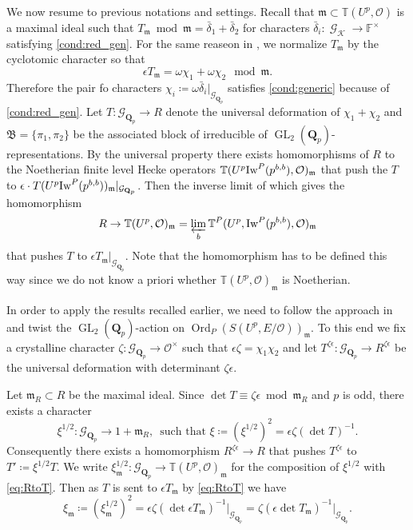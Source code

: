 \documentclass[leqno]{amsart}
\theoremstyle{definition}
\theoremstyle{remark}
\newcommand{\oo}{\mathcal{O}}
\newcommand{\fF}{\mathbb{F}} %
\newcommand{\Qp}{\mathbf{Q}_p}
\DeclareMathOperator{\GL}{GL}
\DeclareMathOperator{\Gal}{\mathcal{G}}
\newcommand{\fm}{\mathfrak{m}}
\DeclareMathOperator{\Ord}{Ord} %
\newcommand{\Gp}{\mathcal{G}_{\Qp}} %
\newcommand{\B}{\mathfrak B} %
\newcommand{\K}{{\mathcal{K}}} %
\newcommand{\Iw}{\textnormal{Iw}} %
\newcommand{\TT}{\mathbb{T}} %
\begin{document}
We now resume to previous notations and settings.
Recall that $\fm\subset \TT(U^p,\oo)$ 
is a maximal ideal such that
$T_\fm\bmod\fm =\bar{\delta}_1+\bar{\delta}_2$
for characters $\bar{\delta}_i\colon \Gal_\K\to \fF^\times$
satisfying \eqref{cond:red_gen}.
For the same reaseon in \cite[Rem 3.5.3]{pan},
we normalize $T_\fm$ by the cyclotomic character so that
\[
    \epsilon T_\fm=\omega\chi_1+\omega\chi_2\mod\fm.
\]
Therefore the pair fo characters
$\chi_i\coloneqq \omega\bar{\delta}_i\vert_{\Gp}$
satisfies \eqref{cond:generic} because of 
\eqref{cond:red_gen}.
Let $T\colon \Gp\to R$
denote the universal deformation 
of $\chi_1+\chi_2$
and $\B=\{\pi_1,\pi_2\}$
be the associated block of irreducible of $\GL_2(\Qp)$-representations.
By the universal property
there exists homomorphisms of $R$
to the Noetherian finite level
Hecke operators $\TT(U^p\Iw^P(p^{b,b}),\oo)_\fm$
that push the $T$ to 
$\epsilon\cdot T(U^p\Iw^P(p^{b,b}))_\fm\vert_{\Gp}$.
Then the inverse limit of which
gives the homomorphism
\begin{equation}\label{eq:RtoT}
    R\to \TT(U^p,\oo)_{\fm}=
    \varprojlim_b\TT^P(U^p,\Iw^P(p^{b,b}),\oo)_{\fm}
\end{equation}
that pushes $T$ to $\epsilon T_\fm\vert_{\Gp}$.
Note that the homomorphism has to be defined this way
since we do not know a priori whether
$\TT(U^p,\oo)_{\fm}$ is Noetherian.

In order to apply the results recalled earlier,
we need to follow the approach in \cite[\S 5]{urban}
and twist the $\GL_2(\Qp)$-action on 
$\Ord_P(S(U^p,E/\oo))_\fm$.
To this end we fix a crystalline character
$\zeta\colon \Gp\to \oo^\times$
such that $\epsilon\zeta=\chi_1\chi_2$
and let 
$T^{\zeta\epsilon}\colon \Gp\to R^{\zeta\epsilon}$
be the universal deformation
with determinant $\zeta\epsilon$.

Let $\fm_R\subset R$ be the maximal ideal.
Since $\det T\equiv \zeta\epsilon\bmod \fm_R$ and $p$ is odd,
there exists a character
\begin{equation}\label{eq:root_char}
	\xi^{1/2}
    \colon \Gp\to 1+
    \fm_{R},
    \, \text{ such that }
	\xi\coloneqq(\xi^{1/2})^2=\epsilon\zeta(\det T)^{-1}.
\end{equation}
Consequently there exists a homomorphism 
$R^{\zeta\epsilon}\to R$ that pushes 
$T^{\zeta\epsilon}$ to $T'\coloneqq \xi^{1/2}T$.
We write $\xi_\fm^{1/2}\colon \Gp\to \TT(U^p,\oo)_\fm$
for the composition of $\xi^{1/2}$ with \eqref{eq:RtoT}.
Then as $T$ is sent to $\epsilon T_\fm$ by \eqref{eq:RtoT} we have
\begin{equation}\label{eq:root_charm}
	\xi_\fm\coloneqq (\xi_\fm^{1/2})^2=
	\epsilon\zeta(\det \epsilon T_\fm)^{-1}\vert_{\Gp}
	=\zeta(\epsilon\det T_\fm)^{-1}\vert_{\Gp}.
\end{equation}
\end{document}
